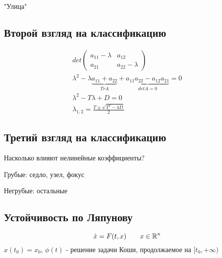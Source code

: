 \documentclass{article}
\begin{document}
"Улица"

\hr

\subsection{Второй взгляд на классификацию}
\begin{gather*}
  det \begin{pmatrix}
    a_{11}-\lambda & a_{12} \\ 
    a_{21} & a_{22} - \lambda
  \end{pmatrix} \\ 
  \lambda^{2}-\lambda \underbrace{a_{11}+a_{22}}_{Tr A}+\underbrace{a_{11}a_{22}-a_{12}a_{21}}_{detA=0}=0 \\ 
  \lambda^{2}-T\lambda+D=0 \\ 
  \lambda_{1,2}=\frac{T\pm \sqrt{T^{2}-4D}}{2}
\end{gather*}


\subsection{Третий взгляд на классификацию}
Насколько влияют нелинейные коэффициенты?

Грубые: седло, узел, фокус

Негрубые: остальные

\subsection{Устойчивость по Ляпунову}
\[
  \dot{x}=F(t,x) \qquad x \in \mathbb{R}^{n}
\]
$x(t_0)=x_0$, $\phi(t)$ - решение задачи Коши, продолжаемое на $[t_0, +\infty)$
\end{document}
